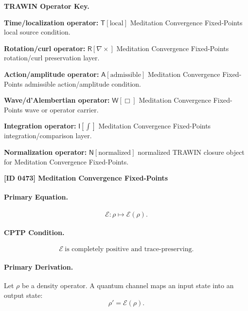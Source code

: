 \par\vspace{0.45\baselineskip}
\noindent\begin{minipage}[t]{\linewidth}
\begingroup
\small
\raggedright
\textbf{TRAWIN Operator Key.}\par
\noindent\textbf{Time/localization operator:} $\mathsf{T}\!\left[\mathrm{local}\right]$ Meditation Convergence Fixed-Points local source condition.\par
\noindent\textbf{Rotation/curl operator:} $\mathsf{R}\!\left[\nabla\times\right]$ Meditation Convergence Fixed-Points rotation/curl preservation layer.\par
\noindent\textbf{Action/amplitude operator:} $\mathsf{A}\!\left[\mathrm{admissible}\right]$ Meditation Convergence Fixed-Points admissible action/amplitude condition.\par
\noindent\textbf{Wave/d'Alembertian operator:} $\mathsf{W}\!\left[\Box\right]$ Meditation Convergence Fixed-Points wave or operator carrier.\par
\noindent\textbf{Integration operator:} $\mathsf{I}\!\left[\int\right]$ Meditation Convergence Fixed-Points integration/comparison layer.\par
\noindent\textbf{Normalization operator:} $\mathsf{N}\!\left[\mathrm{normalized}\right]$ normalized TRAWIN closure object for Meditation Convergence Fixed-Points.\par
\endgroup
\end{minipage}

\clearpage
\noindent\textbf{[ID 0473] Meditation Convergence Fixed-Points}\par
\vspace{0.35em}
\paragraph{Primary Equation.}
\begin{equation}
\mathcal{E}:\rho\mapsto \mathcal{E}(\rho).
\end{equation}

\paragraph{CPTP Condition.}
\begin{equation}
\mathcal{E}\ \text{is completely positive and trace-preserving}.
\end{equation}

\paragraph{Primary Derivation.}
Let $\rho$ be a density operator. A quantum channel maps an input state into an output state:
\begin{equation}
\rho'=\mathcal{E}(\rho).
\end{equation}

